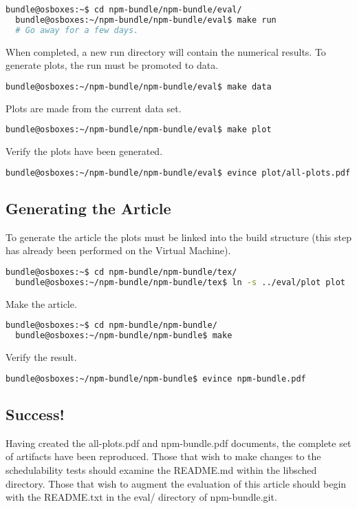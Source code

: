\documentclass[a4paper]{article}
\begin{document}
\begin{lstlisting}[language=bash]
  bundle@osboxes:~$ cd npm-bundle/npm-bundle/eval/
  bundle@osboxes:~/npm-bundle/npm-bundle/eval$ make run
  # Go away for a few days.
\end{lstlisting}

{\noindent}When completed, a new run directory will contain the
numerical results. To generate plots, the run must be promoted to
data. 

\begin{lstlisting}[language=bash]
  bundle@osboxes:~/npm-bundle/npm-bundle/eval$ make data
\end{lstlisting}

{\noindent}Plots are made from the current data set.
\begin{lstlisting}[language=bash]
  bundle@osboxes:~/npm-bundle/npm-bundle/eval$ make plot
\end{lstlisting}

{\noindent}Verify the plots have been generated.
\begin{lstlisting}[language=bash]
  bundle@osboxes:~/npm-bundle/npm-bundle/eval$ evince plot/all-plots.pdf
\end{lstlisting}


\subsection{Generating the Article}

To generate the article the plots must be linked into the build
structure (this step has already been performed on the Virtual
Machine).

\begin{lstlisting}[language=bash]
  bundle@osboxes:~$ cd npm-bundle/npm-bundle/tex/
  bundle@osboxes:~/npm-bundle/npm-bundle/tex$ ln -s ../eval/plot plot
\end{lstlisting}

{\noindent}Make the article.
\begin{lstlisting}[language=bash]
  bundle@osboxes:~$ cd npm-bundle/npm-bundle/
  bundle@osboxes:~/npm-bundle/npm-bundle$ make
\end{lstlisting}

{\noindent}Verify the result.
\begin{lstlisting}[language=bash]
  bundle@osboxes:~/npm-bundle/npm-bundle$ evince npm-bundle.pdf
\end{lstlisting}

\subsection{Success!}

Having created the all-plots.pdf and npm-bundle.pdf documents, the
complete set of artifacts have been reproduced. Those that wish to make
changes to the schedulability tests should examine the README.md
within the libsched directory. Those that wish to augment the
evaluation of this article should begin with the README.txt in the
eval/ directory of npm-bundle.git.
\end{document}
